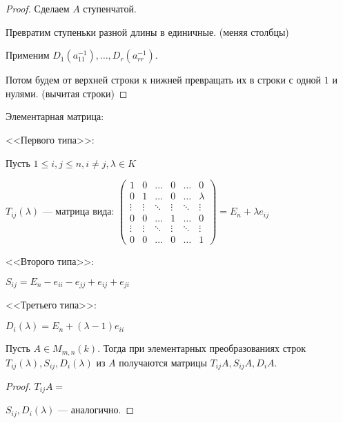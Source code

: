 \begin{proof}
    
    Сделаем $A$ ступенчатой.

    Превратим ступеньки разной длины в единичные. (меняя столбцы)

    Применим $D_1(a_{11}^{-1}), \ldots, D_r(a_{rr}^{-1})$. 

    Потом будем от верхней строки к нижней превращать их в строки с одной $1$ и нулями. (вычитая строки)
\end{proof}

\begin{defn} Элементарная матрица:
    
    <<Первого типа>>:

    Пусть $1 \leq i, j \leq n, i \neq j, \lambda \in K$


    $T_{ij}(\lambda)$ --- матрица вида:
    $ \begin{pmatrix}
        1 & 0 & \ldots & 0 & \ldots & 0 \\
        0 & 1 & \ldots & 0 & \ldots & \lambda \\
        \vdots & \vdots & \ddots & \vdots & \ddots & \vdots \\
        0 & 0 & \ldots & 1 & \ldots & 0 \\
        \vdots & \vdots & \ddots & \vdots & \ddots & \vdots \\
        0 & 0 & \ldots & 0 & \ldots & 1
    \end{pmatrix} = E_n + \lambda e_{ij}$

    <<Второго типа>>:

    $S_{ij} = E_n - e_{ii} - e_{jj} + e_{ij} + e_{ji}$

    <<Третьего типа>>:

    $D_i(\lambda) = E_n + (\lambda - 1) e_{ii}$

\end{defn}

\begin{theorem-non}
    Пусть $A \in M_{m, n}(k)$. Тогда при элементарных преобразованиях строк $T_{ij}(\lambda), S_{ij}, D_i(\lambda)$ из $A$ получаются матрицы $T_{ij} A, S_{ij} A, D_i A$.
\end{theorem-non}

\begin{proof}

    $T_{ij} A = $ 

    $S_{ij}, D_i(\lambda)$ --- аналогично.
\end{proof}

